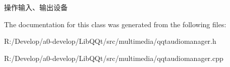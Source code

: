 操作输入、输出设备 

The documentation for this class was generated from the following files\+:\begin{DoxyCompactItemize}
\item 
R\+:/\+Develop/a0-\/develop/\+Lib\+Q\+Qt/src/multimedia/qqtaudiomanager.\+h\item 
R\+:/\+Develop/a0-\/develop/\+Lib\+Q\+Qt/src/multimedia/qqtaudiomanager.\+cpp\end{DoxyCompactItemize}
